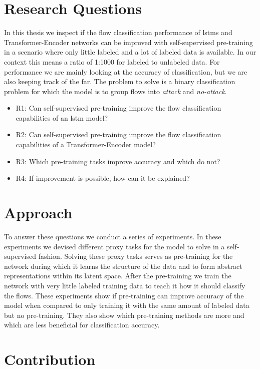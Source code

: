 \section{Research Questions} \label{sect.research_questions}

In this thesis we inspect if the flow classification performance of \glspl{lstm} and Transformer-Encoder networks can be improved with self-supervised pre-training in a scenario where only little labeled and a lot of labeled data is available. In our context this means a ratio of 1:1000 for labeled to unlabeled data. For performance we are mainly looking at the accuracy of classification, but we are also keeping track of the \gls{far}. The problem to solve is a binary classification problem for which the model is to group flows into \textit{attack} and \textit{no-attack}. 

\begin{itemize}
	\item R1: Can self-supervised pre-training improve the flow classification capabilities of an \gls{lstm} model?
	\item R2: Can self-supervised pre-training improve the flow classification capabilities of a Transformer-Encoder model?
	\item R3: Which pre-training tasks improve accuracy and which do not?
	\item R4: If improvement is possible, how can it be explained?
\end{itemize}


\section{Approach} \label{sect.approach}

To answer these questions we conduct a series of experiments. In these experiments we devised different proxy tasks for the model to solve in a self-supervised fashion. Solving these proxy tasks serves as pre-training for the network during which it learns the structure of the data and to form abstract representations within its latent space. After the pre-training we train the network with very little labeled training data to teach it how it should classify the flows. These experiments show if pre-training can improve accuracy of the model when compared to only training it with the same amount of labeled data but no pre-training. They also show which pre-training methods are more and which are less beneficial for classification accuracy.

\section{Contribution} \label{sect.contribution}


